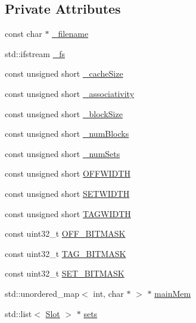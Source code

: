 \subsection*{Private Attributes}
\begin{DoxyCompactItemize}
\item 
const char $\ast$ \hyperlink{class_cache_acf6d51e277094078ec2be7982136c4e8}{\-\_\-filename}
\item 
std\-::ifstream \hyperlink{class_cache_acf30051e72f4bd049a378a1248036bea}{\-\_\-fs}
\item 
const unsigned short \hyperlink{class_cache_a36f90f0287a082a467fab29c442a92e8}{\-\_\-cache\-Size}
\item 
const unsigned short \hyperlink{class_cache_aa48d46cd82958c590c84ec1f91dbf261}{\-\_\-associativity}
\item 
const unsigned short \hyperlink{class_cache_a4f8fa4061ddaa6bd961564e7ce1ad382}{\-\_\-block\-Size}
\item 
const unsigned short \hyperlink{class_cache_aedf1134f3281104ebb38268579a50ce3}{\-\_\-num\-Blocks}
\item 
const unsigned short \hyperlink{class_cache_a7f279c793a54d916e233aab499ffb496}{\-\_\-num\-Sets}
\item 
const unsigned short \hyperlink{class_cache_aebf8c6225d7fddef09919904808b03d1}{O\-F\-F\-W\-I\-D\-T\-H}
\item 
const unsigned short \hyperlink{class_cache_abd79a5c5d61c93a4b9468ba706543bb8}{S\-E\-T\-W\-I\-D\-T\-H}
\item 
const unsigned short \hyperlink{class_cache_aac8e43dd87842bf59c9306ca5a2213e9}{T\-A\-G\-W\-I\-D\-T\-H}
\item 
const uint32\-\_\-t \hyperlink{class_cache_a6ba6b28609e0f72dbb04101599f99df0}{O\-F\-F\-\_\-\-B\-I\-T\-M\-A\-S\-K}
\item 
const uint32\-\_\-t \hyperlink{class_cache_acb9d1d9c3659dc0583538d282243591b}{T\-A\-G\-\_\-\-B\-I\-T\-M\-A\-S\-K}
\item 
const uint32\-\_\-t \hyperlink{class_cache_a06111c36179db89cb21825c59edfb767}{S\-E\-T\-\_\-\-B\-I\-T\-M\-A\-S\-K}
\item 
std\-::unordered\-\_\-map$<$ int, char $\ast$ $>$ $\ast$ \hyperlink{class_cache_a2c6c646ab22036ab0df36809fa7d5ab1}{main\-Mem}
\item 
std\-::list$<$ \hyperlink{struct_cache_1_1_slot}{Slot} $>$ $\ast$ \hyperlink{class_cache_a888e02489d269b8f65271917af3bac57}{sets}
\end{DoxyCompactItemize}


